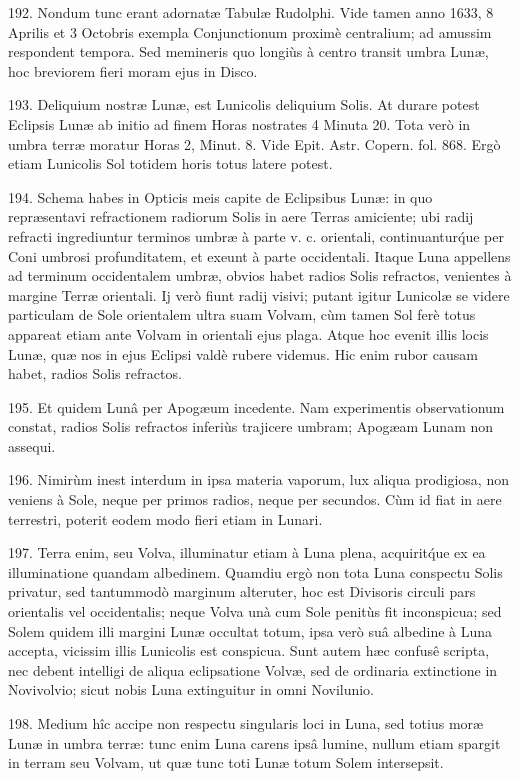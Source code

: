 \documentclass[a4paper, 11pt, oneside, polutonikogreek, german]{article}
\begin{document}
192. Nondum tunc erant adornatæ Tabulæ Rudolphi. Vide tamen anno 1633, 8 Aprilis et 3 Octobris exempla Conjunctionum proximè centralium; ad amussim respondent tempora. Sed memineris quo longiùs à centro transit umbra Lunæ, hoc breviorem fieri moram ejus in Disco.

193. Deliquium nostræ Lunæ, est Lunicolis deliquium Solis. At durare potest Eclipsis Lunæ ab initio ad finem Horas nostrates 4 Minuta 20. Tota verò in umbra terræ moratur Horas 2, Minut. 8. Vide Epit. Astr. Copern. fol. 868. Ergò etiam Lunicolis Sol totidem horis totus latere potest.

194. Schema habes in Opticis meis capite de Eclipsibus Lunæ: in quo repræsentavi refractionem radiorum Solis in aere Terras amiciente; ubi radij refracti ingrediuntur terminos umbræ à parte v. c. orientali, continuantur\'que per Coni umbrosi profunditatem, et exeunt à parte occidentali. Itaque Luna appellens ad terminum occidentalem umbræ, obvios habet radios Solis refractos, venientes à margine Terræ orientali. Ij verò fiunt radij visivi; putant igitur Lunicolæ se videre particulam de Sole orientalem ultra suam Volvam, cùm tamen Sol ferè totus appareat etiam ante Volvam in orientali ejus plaga. Atque hoc evenit illis locis Lunæ, quæ nos in ejus Eclipsi valdè rubere videmus. Hic enim rubor causam habet, radios Solis refractos.

195. Et quidem Lunâ per Apogæum incedente. Nam experimentis observationum constat, radios Solis refractos inferiùs trajicere umbram; Apogæam Lunam non assequi.

196. Nimirùm inest interdum in ipsa materia vaporum, lux aliqua prodigiosa, non veniens à Sole, neque per primos radios, neque per secundos. Cùm id fiat in aere terrestri, poterit eodem modo fieri etiam in Lunari.

197. Terra enim, seu Volva, illuminatur etiam à Luna plena, acquirit\'que ex ea illuminatione quandam albedinem. Quamdiu ergò non tota Luna conspectu Solis privatur, sed tantummodò marginum alteruter, hoc est Divisoris circuli pars orientalis vel occidentalis; neque Volva unà cum Sole penitùs fit inconspicua; sed Solem quidem illi margini Lunæ occultat totum, ipsa verò suâ albedine à Luna accepta, vicissim illis Lunicolis est conspicua. Sunt autem hæc confusê scripta, nec debent intelligi de aliqua eclipsatione Volvæ, sed de ordinaria extinctione in Novivolvio; sicut nobis Luna extinguitur in omni Novilunio.

198. Medium hîc accipe non respectu singularis loci in Luna, sed totius moræ Lunæ in umbra terræ: tunc enim Luna carens ipsâ lumine, nullum etiam spargit in terram seu Volvam, ut quæ tunc toti Lunæ totum Solem intersepsit.
\end{document}
